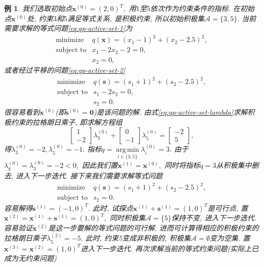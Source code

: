 \documentclass{SBCbookchapter}
\newcommand{\V}[1]{{\bm{#1}}}
\DeclareMathOperator*{\argmin}{arg\,min}
\newtheorem{eg}[thm]{例}
\numberwithin{equation}{section}
\begin{document}
\begin{eg}
我们选取初始点$\V{x}^{(0)} = (2, 0)^T,$ 用$1$至$5$依次作为约束条件的指标. 在初始点$\V{x}^{(0)}$处, 约束$3$和$5$满足等式关系, 是积极约束, 所以初始积极集$\mathcal{A} = \{ 3, 5 \}.$ 当前需要求解的等式问题\eqref{eq:qp-active-set-1}为
\begin{equation*}
\begin{array}{cl}
\text{minimize} & q(\V{x}) = (x_1 - 1)^2 + (x_2 - 2.5)^2, \\
\text{subject to} & x_1 - 2x_2 - 2 = 0, \\
& x_2 = 0,
\end{array}
\end{equation*}
或者经过平移的问题\eqref{eq:qp-active-set-2}
\begin{equation*}
\begin{array}{cl}
\text{minimize} & q(\V{s}) = (s_1 + 1)^2 + (s_2 - 2.5)^2, \\
\text{subject to} & s_1 - 2s_2 = 0, \\
& s_2 = 0.
\end{array}
\end{equation*}
很容易看到$\V{x}^{(0)}$(即$\V{s}^{(0)} = \V{0}$)是该问题的解. 由式\eqref{eq:qp-active-set-lambda}求解积极约束的拉格朗日乘子, 即求解方程组
\begin{equation*}
\begin{bmatrix} 1 \\ -2 \end{bmatrix} \lambda_3^{(0)} + \begin{bmatrix} 0 \\ -1 \end{bmatrix} \lambda_5^{(0)} = \begin{bmatrix} -2 \\ 5 \end{bmatrix},
\end{equation*}
得$\lambda_3^{(0)} = -2, \lambda_5^{(0)} = -1.$ 指标$q = \argmin\limits_{i \in \{ 3, 5 \}} \lambda_i^{(0)} = 3.$ 由于$\lambda_q^{(0)} = \lambda_3^{(0)} = -2 < 0,$ 因此我们置$\V{x}^{(1)} = \V{x}^{(0)},$ 同时将指标$q = 3$从积极集中删去, 进入下一步迭代. 接下来我们需要求解等式问题
\begin{equation*}
\begin{array}{cl}
\text{minimize} & q(\V{s}) = (s_1 + 1)^2 + (s_2 - 2.5)^2, \\
\text{subject to} & s_2 = 0.
\end{array}
\end{equation*}
容易解得$\V{s}^{(1)} = (-1, 0)^T.$ 此时, 试探点$\V{x}^{(1)} + \V{s}^{(1)} = (1, 0)^T$是可行点, 置$\V{x}^{(2)} = \V{x}^{(1)} + \V{s}^{(1)} = (1, 0)^T,$ 同时积极集$\mathcal{A} = \{ 5 \}$保持不变, 进入下一步迭代. 容易验证$\V{x}^{(2)}$是这一步要解的等式问题的可行解, 进而可计算得相应的积极约束的拉格朗日乘子$\lambda_5^{(2)} = -5.$ 此时, 约束5变成非积极的, 积极集$\mathcal{A} = \emptyset$变为空集. 置$\V{x}^{(3)} = \V{x}^{(2)} = (1, 0)^T$进入下一步迭代. 再次求解当前的等式约束问题(实际上已成为无约束问题)

\end{eg}
\end{document}
